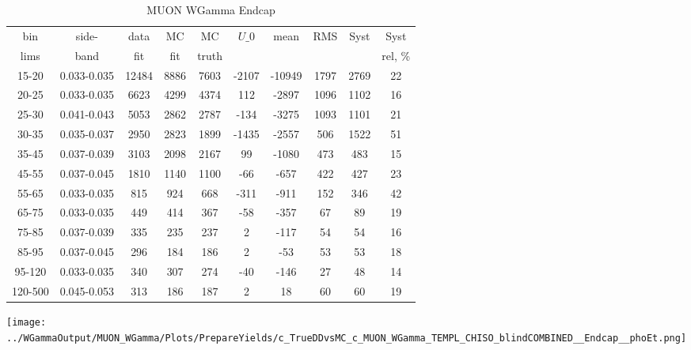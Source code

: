 \documentclass{beamer}
\begin{document}
\begin{frame}
{
\begin{table}[h]
  	\tiny
  \begin{center}
  \caption{MUON WGamma Endcap}
  \begin{tabular}{|c|c|c|c|c|c|c|c|c|c|}
    bin & side- & data & MC & MC    & $U\_{0}$ & mean & RMS & Syst & Syst \\ 
    lims & band & fit & fit & truth &       &      &     &      & rel, \% \\ \hline
    15-20 & 0.033-0.035 & 12484 & 8886 & 7603 & -2107 & -10949 & 1797 & 2769 & 22  \\ \hline
    20-25 & 0.033-0.035 & 6623 & 4299 & 4374 & 112 & -2897 & 1096 & 1102 & 16  \\ \hline
    25-30 & 0.041-0.043 & 5053 & 2862 & 2787 & -134 & -3275 & 1093 & 1101 & 21  \\ \hline
    30-35 & 0.035-0.037 & 2950 & 2823 & 1899 & -1435 & -2557 & 506 & 1522 & 51  \\ \hline
    35-45 & 0.037-0.039 & 3103 & 2098 & 2167 & 99 & -1080 & 473 & 483 & 15  \\ \hline
    45-55 & 0.037-0.045 & 1810 & 1140 & 1100 & -66 & -657 & 422 & 427 & 23  \\ \hline
    55-65 & 0.033-0.035 & 815 & 924 & 668 & -311 & -911 & 152 & 346 & 42  \\ \hline
    65-75 & 0.033-0.035 & 449 & 414 & 367 & -58 & -357 & 67 & 89 & 19  \\ \hline
    75-85 & 0.037-0.039 & 335 & 235 & 237 & 2 & -117 & 54 & 54 & 16  \\ \hline
    85-95 & 0.037-0.045 & 296 & 184 & 186 & 2 & -53 & 53 & 53 & 18  \\ \hline
    95-120 & 0.033-0.035 & 340 & 307 & 274 & -40 & -146 & 27 & 48 & 14  \\ \hline
    120-500 & 0.045-0.053 & 313 & 186 & 187 & 2 & 18 & 60 & 60 & 19  \\ \hline
  \end{tabular}
  \label{tab:systSbVar_Meth1_MUON_WGamma_Endcap}
  \end{center}
\end{table}

\texttt{[image: ../WGammaOutput/MUON\_WGamma/Plots/PrepareYields/c\_TrueDDvsMC\_c\_MUON\_WGamma\_TEMPL\_CHISO\_blindCOMBINED\_\_Endcap\_\_phoEt.png]} 

}
\end{frame}
\end{document}
